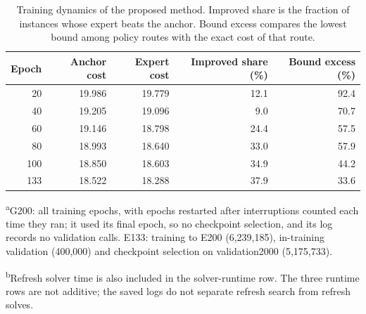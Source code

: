 \documentclass[preprint,12pt,authoryear]{elsarticle}
\begin{document}
\begin{table}[t]
\centering
\caption{Training dynamics of the proposed method. Improved share is the fraction of instances whose expert beats the anchor. Bound excess compares the lowest bound among policy routes with the exact cost of that route.}
\label{tab:dynamics}
\small
\begin{tabular}{rrrrr}
\toprule
Epoch & Anchor cost & Expert cost & Improved share (\%) & Bound excess (\%) \\
\midrule
20 & 19.986 & 19.779 & 12.1 & 92.4 \\
40 & 19.205 & 19.096 & 9.0 & 70.7 \\
60 & 19.146 & 18.798 & 24.4 & 57.5 \\
80 & 18.993 & 18.640 & 33.0 & 57.9 \\
100 & 18.850 & 18.603 & 34.9 & 44.2 \\
133 & 18.522 & 18.288 & 37.9 & 33.6 \\
\bottomrule
\end{tabular}
\end{table}

\begin{table}[t]
\centering
\caption{Training budgets of G200 and E133.}
\label{tab:budget}
\small
{}
\par\smallskip\footnotesize\raggedright \textsuperscript{a}G200: all training epochs, with epochs restarted after interruptions counted each time they ran; it used its final epoch, so no checkpoint selection, and its log records no validation calls. E133: training to E200 (6,239,185), in-training validation (400,000) and checkpoint selection on validation2000 (5,175,733).
\par \textsuperscript{b}Refresh solver time is also included in the solver-runtime row. The three runtime rows are not additive; the saved logs do not separate refresh search from refresh solves.
\end{table}
\end{document}
